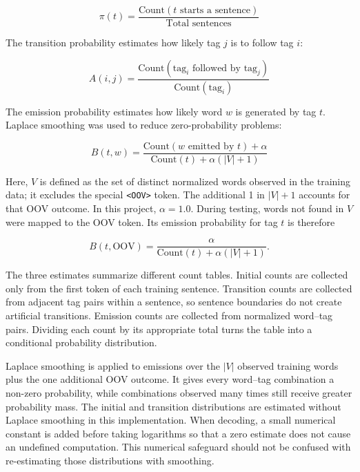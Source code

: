 \documentclass[12pt,a4paper]{article}
\begin{document}
\begin{equation}
\pi(t) = \frac{\text{Count}(t \text{ starts a sentence})}
{\text{Total sentences}}
\end{equation}

The transition probability estimates how likely tag $j$ is to follow tag $i$:

\begin{equation}
A(i,j) = \frac{\text{Count}(\text{tag}_i \text{ followed by } \text{tag}_j)}
{\text{Count}(\text{tag}_i)}
\end{equation}

The emission probability estimates how likely word $w$ is generated by tag $t$.
Laplace smoothing was used to reduce zero-probability problems:

\begin{equation}
B(t,w) = \frac{\text{Count}(w \text{ emitted by } t) + \alpha}
{\text{Count}(t) + \alpha (|V| + 1)}
\end{equation}

Here, $V$ is defined as the set of distinct normalized words observed in the
training data; it excludes the special \texttt{\textless OOV\textgreater}
token. The additional 1 in $|V|+1$ accounts for that OOV outcome. In this
project, $\alpha = 1.0$. During testing, words not found in $V$ were mapped to
the OOV token. Its emission probability for tag $t$ is therefore

\begin{equation}
B(t,\text{OOV}) = \frac{\alpha}
{\text{Count}(t) + \alpha (|V| + 1)}.
\end{equation}

The three estimates summarize different count tables. Initial counts are
collected only from the first token of each training sentence. Transition counts
are collected from adjacent tag pairs within a sentence, so sentence boundaries
do not create artificial transitions. Emission counts are collected from
normalized word--tag pairs. Dividing each count by its appropriate total turns
the table into a conditional probability distribution.

Laplace smoothing is applied to emissions over the $|V|$ observed training
words plus the one additional OOV outcome. It gives every
word--tag combination a non-zero probability, while combinations observed many
times still receive greater probability mass. The initial and transition
distributions are estimated without Laplace smoothing in this implementation.
When decoding, a small numerical constant is added before taking logarithms so
that a zero estimate does not cause an undefined computation. This numerical
safeguard should not be confused with re-estimating those distributions with
smoothing.
\end{document}
